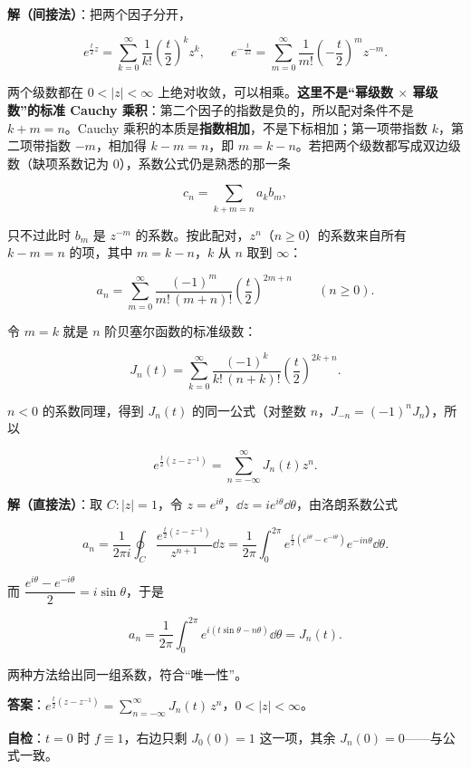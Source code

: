 \documentclass[11pt]{ctexart}
\let\origsubhdr\subhdr
\renewcommand{\subhdr}[1]{\par\needspace{4\baselineskip}\origsubhdr{#1}}
\let\orighdr\hdr
\renewcommand{\hdr}[2]{\par\needspace{9\baselineskip}\orighdr{#1}{#2}}
\begin{document}
\textbf{解（间接法）}：把两个因子分开，

\[ e^{\frac t2 z}=\sum_{k=0}^{\infty}\frac{1}{k!}\left(\frac t2\right)^kz^k ,\qquad e^{-\frac{t}{2z}}=\sum_{m=0}^{\infty}\frac{1}{m!}\left(-\frac{t}{2}\right)^mz^{-m} . \]

两个级数都在 $0<|z|<\infty$ 上绝对收敛，可以相乘。\textbf{这里不是“幂级数 $\times$ 幂级数”的标准 Cauchy 乘积}：第二个因子的指数是负的，所以配对条件不是 $k+m=n$。Cauchy 乘积的本质是\textbf{指数相加}，不是下标相加；第一项带指数 $k$，第二项带指数 $-m$，相加得 $k-m=n$，即 $m=k-n$。若把两个级数都写成双边级数（缺项系数记为 0），系数公式仍是熟悉的那一条

\[ c_n=\sum_{k+m=n}a_kb_m , \]

只不过此时 $b_m$ 是 $z^{-m}$ 的系数。按此配对，$z^n$（$n\ge0$）的系数来自所有 $k-m=n$ 的项，其中 $m=k-n$，$k$ 从 $n$ 取到 $\infty$：

\[ a_n=\sum_{m=0}^{\infty}\frac{(-1)^m}{m!\,(m+n)!}\left(\frac t2\right)^{2m+n}\qquad(n\ge 0) . \]

令 $m=k$ 就是 $n$ 阶贝塞尔函数的标准级数：

\[ J_n(t)=\sum_{k=0}^{\infty}\frac{(-1)^k}{k!\,(n+k)!}\left(\frac t2\right)^{2k+n} . \]

$n<0$ 的系数同理，得到 $J_n(t)$ 的同一公式（对整数 $n$，$J_{-n}=(-1)^nJ_n$），所以

\[ e^{\frac t2\left(z-z^{-1}\right)}=\sum_{n=-\infty}^{\infty}J_n(t)z^n . \]

\textbf{解（直接法）}：取 $C:|z|=1$，令 $z=e^{i\theta}$，$\dd z=ie^{i\theta}\dd\theta$，由洛朗系数公式

\[ a_n=\frac{1}{2\pi i}\oint_C\frac{e^{\frac t2\left(z-z^{-1}\right)}}{z^{n+1}}\dd z =\frac{1}{2\pi}\int_0^{2\pi}e^{\frac t2\left(e^{i\theta}-e^{-i\theta}\right)}e^{-in\theta}\dd\theta . \]

而 $\dfrac{e^{i\theta}-e^{-i\theta}}{2}=i\sin\theta$，于是

\[ a_n=\frac{1}{2\pi}\int_0^{2\pi}e^{i\left(t\sin\theta-n\theta\right)}\dd\theta=J_n(t) . \]

两种方法给出同一组系数，符合“唯一性”。

\textbf{答案}：$\displaystyle e^{\frac t2\left(z-z^{-1}\right)}=\sum_{n=-\infty}^{\infty}J_n(t)\,z^n$，$0<|z|<\infty$。

\textbf{自检}：$t=0$ 时 $f\equiv1$，右边只剩 $J_0(0)=1$ 这一项，其余 $J_n(0)=0$——与公式一致。


\end{document}

